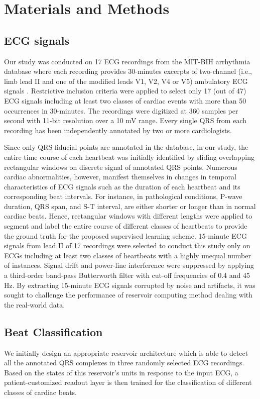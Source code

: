 \documentclass[review]{elsarticle}
\begin{document}
\section{Materials and Methods}\label{Methods}
\subsection{ECG signals}

Our study was conducted on 17 ECG recordings from the MIT-BIH
arrhythmia database where each recording provides 30-minutes excerpts of two-channel (i.e., limb lead II and one of the modified leads V1, V2, V4 or V5) ambulatory ECG signals \cite{goldberger2000physiobank,moody2001impact}. Restrictive inclusion criteria were applied to select only 17 (out of 47) ECG signals including at least two classes of cardiac events with more than 50 occurrences in 30-minutes. The recordings were digitized at 360 samples per second with 11-bit resolution over a 10 mV range. Every single QRS from each recording has been independently annotated by two or more cardiologists.

Since only QRS fiducial points are annotated in the database, in our study, the entire time course of each heartbeat was initially identified by sliding overlapping rectangular windows on discrete signal of annotated QRS points. Numerous cardiac abnormalities, however, manifest themselves in changes in temporal characteristics of ECG signals such as the duration of each heartbeat and its corresponding beat intervals. For instance, in pathological conditions, P-wave duration, QRS span, and S-T interval, are either shorter or longer than in normal cardiac beats. Hence, rectangular windows with different lengths were applied to segment and label the entire course of different classes of heartbeats to provide the ground truth for the proposed supervised learning scheme. 15-minute ECG signals from lead II of 17 recordings were selected to conduct this study only on ECGs including at least two classes of heartbeats with a highly unequal number of instances. Signal drift and power-line interference were suppressed by applying a third-order band-pass Butterworth filter with cut-off frequencies of 0.4 and 45 Hz. By extracting 15-minute ECG signals corrupted by noise and artifacts, it was sought to challenge the performance of reservoir computing method dealing with the real-world data.

\subsection{Beat Classification}
We initially design an appropriate reservoir architecture which is able to detect all the annotated QRS complexes in three randomly selected ECG recordings. Based on the states of this reservoir's units in response to the input ECG, a patient-customized readout layer is then trained for the classification of different classes of cardiac beats. 
\end{document}
